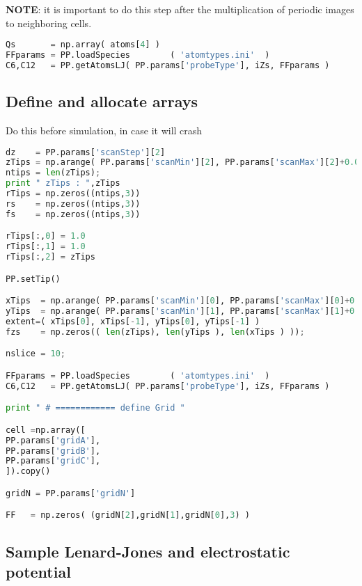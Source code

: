 \textbf{NOTE}: it is important to do this step after the multiplication of periodic
images to neighboring cells.

\begin{shadedbox}
    \begin{lstlisting}[language=python]
Qs       = np.array( atoms[4] )
FFparams = PP.loadSpecies        ( 'atomtypes.ini'  )
C6,C12   = PP.getAtomsLJ( PP.params['probeType'], iZs, FFparams )
   \end{lstlisting}
\end{shadedbox}

\subsection{Define and allocate arrays}
Do this before simulation, in case it will crash

\begin{shadedbox}
    \begin{lstlisting}[language=python]
dz    = PP.params['scanStep'][2]
zTips = np.arange( PP.params['scanMin'][2], PP.params['scanMax'][2]+0.00001, dz )[::-1];
ntips = len(zTips);
print " zTips : ",zTips
rTips = np.zeros((ntips,3))
rs    = np.zeros((ntips,3))
fs    = np.zeros((ntips,3))

rTips[:,0] = 1.0
rTips[:,1] = 1.0
rTips[:,2] = zTips

PP.setTip()

xTips  = np.arange( PP.params['scanMin'][0], PP.params['scanMax'][0]+0.00001, 0.1 )
yTips  = np.arange( PP.params['scanMin'][1], PP.params['scanMax'][1]+0.00001, 0.1 )
extent=( xTips[0], xTips[-1], yTips[0], yTips[-1] )
fzs    = np.zeros(( len(zTips), len(yTips ), len(xTips ) ));

nslice = 10;

FFparams = PP.loadSpecies        ( 'atomtypes.ini'  )
C6,C12   = PP.getAtomsLJ( PP.params['probeType'], iZs, FFparams )

print " # ============ define Grid "

cell =np.array([
PP.params['gridA'],
PP.params['gridB'],
PP.params['gridC'],
]).copy()

gridN = PP.params['gridN']

FF   = np.zeros( (gridN[2],gridN[1],gridN[0],3) )

   \end{lstlisting}
\end{shadedbox}




\subsection{Sample Lenard-Jones and electrostatic potential}

